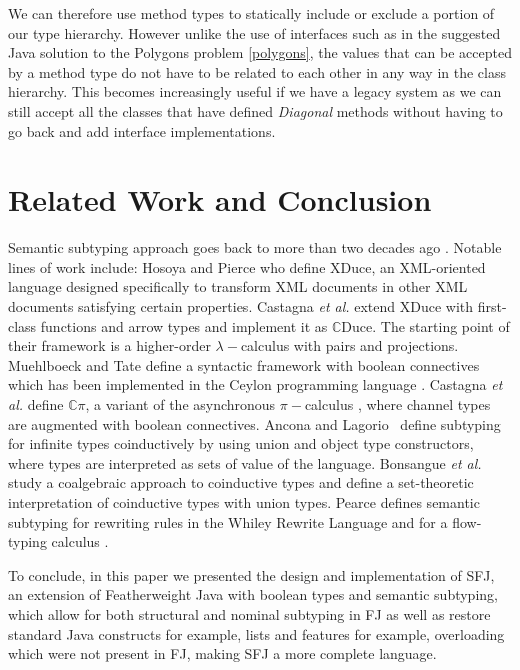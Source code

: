 \documentclass[runningheads]{llncs}
\begin{document}
We can therefore use method types to statically include or exclude a portion of our type hierarchy.
However unlike the use of interfaces such as in the suggested Java solution to the Polygons problem \autoref{polygons}, the values that can be accepted by a method type do not have to be related to each other in any way in the class hierarchy.
This becomes increasingly useful if we have a legacy system as we can still accept all the classes that have defined \emph{Diagonal} methods without having to go back and add interface implementations.


\section{Related Work and Conclusion}
\label{sec:conclusion}

Semantic subtyping approach goes back to more than two decades ago \cite{Aiken,Damm}.
Notable lines of work include:
Hosoya and Pierce \cite{XML1,XML2,XML3} who define XDuce, an XML-oriented language designed specifically to transform XML documents in other XML documents satisfying certain properties.
Castagna \emph{et al.} \cite{Castagna2005,Cas05,FCB08} extend XDuce with first-class functions and arrow types and implement it as $\mathbb{C}$Duce. The starting point of their framework is a higher-order $\lambda-$calculus with pairs and projections.
Muehlboeck and Tate \cite{Muehlboeck2018} define a syntactic framework with boolean connectives which has been implemented in the Ceylon programming language \cite{Ceylon2016}.
Castagna \emph{et al.} \cite{Cpi} define $\mathbb{C}\pi$, a variant of the asynchronous $\pi-$calculus \cite{sangiorgi}, where channel types are augmented with boolean connectives.
Ancona and Lagorio~\cite{AL10} define subtyping for infinite types coinductively by using union and object type constructors, where types are interpreted as sets of value of the language.
Bonsangue \emph{et al.}~\cite{BRABR14} study a coalgebraic approach to coinductive types and define a set-theoretic interpretation of coinductive types with union types.
Pearce \cite{Pearce19} defines semantic subtyping for rewriting rules in the Whiley Rewrite Language and for a flow-typing calculus  \cite{Pearce13}.

To conclude, in this paper we presented the design and implementation of SFJ, an extension of Featherweight Java with boolean types and semantic subtyping, which allow for both structural and nominal subtyping in FJ as well as restore standard Java constructs for example, lists and features for example, overloading which were not present in FJ, making SFJ a more complete language.

\newpage


\end{document}
